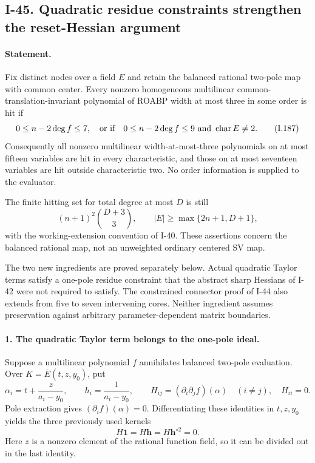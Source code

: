 \subsection{I-45. Quadratic residue constraints strengthen the reset-Hessian argument}
\label{I-45}

\paragraph{Statement.}
Fix distinct nodes over a field $E$ and retain the balanced
rational two-pole map with common center. Every nonzero
homogeneous multilinear common-translation-invariant
polynomial of ROABP width at most three in some order is
hit if
\[
 0\le n-2\deg f\le7,
 \quad\hbox{or if}\quad
 0\le n-2\deg f\le9\ \hbox{and }\operatorname{char}E\ne2.
 \tag{I.187}
\]
Consequently all nonzero multilinear width-at-most-three
polynomials on at most fifteen variables are hit in every
characteristic, and those on at most seventeen variables
are hit outside characteristic two. No order information
is supplied to the evaluator.

The finite hitting set for total degree at most $D$ is still
\[
 (n+1)^2\binom{D+3}{3},\qquad
 |E|\ge\max\{2n+1,D+1\},
 \tag{I.188}
\]
with the working-extension convention of I-40. These
assertions concern the balanced rational map, not an
unweighted ordinary centered SV map.

The two new ingredients are proved separately below.
Actual quadratic Taylor terms satisfy a one-pole residue
constraint that the abstract sharp Hessians of I-42 were
not required to satisfy. The constrained connector proof
of I-44 also extends from five to seven intervening cores.
Neither ingredient assumes preservation against arbitrary
parameter-dependent matrix boundaries.

\paragraph{1. The quadratic Taylor term belongs to the one-pole ideal.}
Suppose a multilinear polynomial $f$ annihilates balanced
two-pole evaluation. Over
$K=\overline E(t,z,y_0)$, put
\[
 \alpha_i=t+\frac{z}{a_i-y_0},\qquad
 h_i=\frac1{a_i-y_0},\qquad
 H_{ij}=(\partial_i\partial_j f)(\alpha)\quad(i\ne j),
 \quad H_{ii}=0.
 \tag{I.189}
\]
Pole extraction gives $(\partial_i f)(\alpha)=0$.
Differentiating these identities in $t,z,y_0$ yields the
three previously used kernels
\[
 H\mathbf1=H\mathbf h=H\mathbf h^{\circ2}=0.
 \tag{I.190}
\]
Here $z$ is a nonzero element of the rational function
field, so it can be divided out in the last identity.


